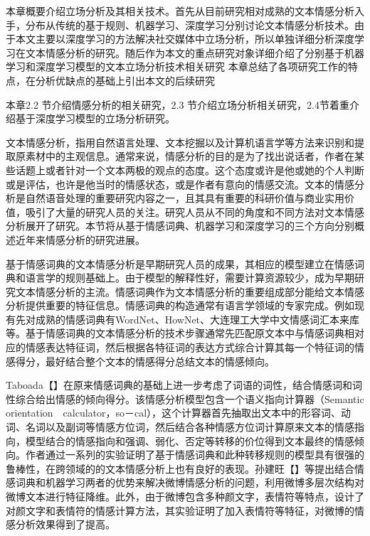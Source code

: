 

本章概要介绍立场分析及其相关技术。首先从目前研究相对成熟的文本情感分析入手，分布从传统的基于规则、机器学习、深度学习分别讨论文本情感分析技术。由于本文主要以深度学习的方法解决社交媒体中立场分析，所以单独详细分析深度学习在文本情感分析的研究。随后作为本文的重点研究对象详细介绍了分别基于机器学习和深度学习模型的文本立场分析技术相关研究 本章总结了各项研究工作的特点，在分析优缺点的基础上引出本文的后续研究

本章2.2 节介绍情感分析的相关研究，2.3 节介绍立场分析相关研究，2.4节着重介绍基于深度学习模型的立场分析研究。

文本情感分析，指用自然语言处理、文本挖掘以及计算机语言学等方法来识别和提取原素材中的主观信息。通常来说，情感分析的目的是为了找出说话者，作者在某些话题上或者针对一个文本两极的观点的态度。这个态度或许是他或她的个人判断或是评估，也许是他当时的情感状态，或是作者有意向的情感交流。文本的情感分析是自然语音处理的重要研究内容之一，且其具有重要的科研价值与商业实用价值，吸引了大量的研究人员的关注。研究人员从不同的角度和不同方法对文本情感分析展开了研究。本节将从基于情感词典、机器学习和深度学习的三个方向分别概述近年来情感分析的研究进展。

基于情感词典的文本情感分析是早期研究人员的成果，其相应的模型建立在情感词典和语言学的规则基础上。由于模型的解释性好，需要计算资源较少，成为早期研究文本情感分析的主流。情感词典作为文本情感分析的重要组成部分能给文本情感分析提供重要的特征信息。情感词典的构造通常有语言学领域的专家完成。例如现有先对成熟的情感词典有WordNet、HowNet、大连理工大学中文情感词汇本来库等。基于情感词典的文本情感分析的技术步骤通常先匹配原文本中与情感词典相对应的情感表达特征词，然后根据各特征词的表达方式综合计算其每一个特征词的情感得分，最好结合整个文本的情感得分总结文本的情感倾向。

Taboada【】在原来情感词典的基础上进一步考虑了词语的词性，结合情感词和词性综合给出情感的倾向得分。该情感分析模型包含一个语义指向计算器（Semantic　orientation　calculator，so－cal），这个计算器首先抽取出文本中的形容词、动词、名词以及副词等情感方位词，然后结合各种情感方位词计算原来文本的情感指向，模型结合的情感指向和强调、弱化、否定等转移的价位得到文本最终的情感倾向。作者通过一系列的实验证明了基于情感词典和此种转移规则的模型具有很强的鲁棒性，在跨领域的的文本情感分析上也有良好的表现。孙建旺【】等提出结合情感词典和机器学习两者的优势来解决微博情感分析的问题，利用微博多层次结构对微博文本进行特征降维。此外，由于微博包含多种颜文字，表情符等特点，设计了对颜文字和表情符的情感计算方法，其实验证明了加入表情符等特征，对微博的情感分析效果得到了提高。

